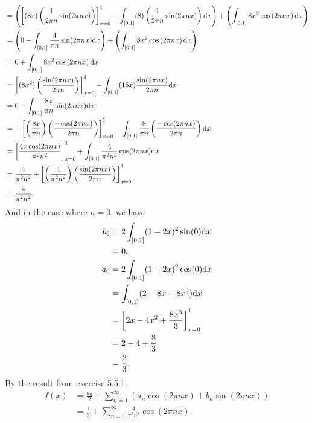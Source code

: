 \documentclass{article}
\begin{document}
\begin{enumerate}[label=(\alph*)]
\begin{align*}
                &= \left( \left[ (8x) \left( \frac{1}{2 \pi n} \sin(2\pi n x) \right) \right]_{x=0}^1 - \int_{[0,1]} (8) \left( \frac{1}{2 \pi n} \sin(2\pi n x) \right) \mathrm{d} x \right) + \left( \int_{[0,1]} 8x^2 \cos \left( 2 \pi n x \right) \mathrm{d} x \right) \\
                &= \left( 0 - \int_{[0,1]} \frac{4}{\pi n} \sin(2\pi n x) \mathrm{d} x \right) + \left( \int_{[0,1]} 8x^2 \cos \left( 2 \pi n x \right) \mathrm{d} x \right) \\
                &= 0 + \int_{[0,1]} 8x^2 \cos \left( 2 \pi n x \right) \mathrm{d} x \\
                &= \left[ (8x^2) \left( \frac{\sin(2\pi n x)}{2 \pi n} \right)  \right]_{x=0}^1 - \int_{[0,1]} (16x) \frac{\sin(2\pi n x)}{2 \pi n} \mathrm{d} x \\
                &= 0 - \int_{[0,1]} \frac{8x}{\pi n} \sin(2\pi n x) \mathrm{d} x \\
                &= -\left[ \left( \frac{8x}{\pi n} \right) \left( \frac{-\cos(2\pi n x)}{2 \pi n} \right) \right]_{x=0}^1 - \int_{[0,1]} \frac{8}{\pi n} \left( \frac{-\cos(2\pi n x)}{2 \pi n} \right) \mathrm{d} x \\
                &= \left[ \frac{4x\cos(2\pi n x)}{\pi^2 n^2} \right]_{x=0}^1 + \int_{[0,1]} \frac{4}{\pi^2 n^2} \cos(2\pi n x) \mathrm{d} x \\
                &= \frac{4}{\pi^2 n^2} + \left[ \left( \frac{4}{\pi^2 n^2} \right) \left( \frac{\sin(2\pi n x)}{2 \pi n} \right) \right]_{x=0}^1 \\
                &= \frac{4}{\pi^2 n^2}.
    \end{align*}
    And in the case where $n=0$, we have \begin{align*}
        b_0 &= 2 \int_{[0,1]} (1-2x)^2 \sin(0) \mathrm{d} x \\
            &= 0. \\
        a_0 &= 2 \int_{[0,1]} (1-2x)^2 \cos(0) \mathrm{d} x \\
            &= \int_{[0,1]} (2-8x+8x^2) \mathrm{d} x \\
            &= \left[ 2x- 4x^2 + \frac{8x^3}{3} \right]_{x=0}^1 \\
            &= 2-4+ \frac{8}{3} \\
            &= \frac{2}{3}.
    \end{align*}
    By the result from exercise 5.5.1, \begin{align*}
        f(x) &= \frac{a_0}{2} + \sum_{n=1}^\infty \left( a_n \cos(2\pi nx) + b_n \sin(2\pi nx) \right) \\
             &= \frac{1}{3} + \sum_{n=1}^\infty \frac{4}{\pi^2n^2} \cos(2\pi nx).

\end{align*}
\end{enumerate}
\end{document}
